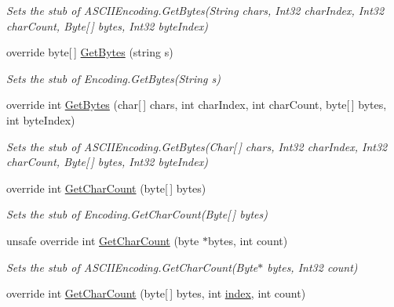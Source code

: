 \begin{DoxyCompactItemize}
\begin{DoxyCompactList}\small\item\em Sets the stub of A\-S\-C\-I\-I\-Encoding.\-Get\-Bytes(\-String chars, Int32 char\-Index, Int32 char\-Count, Byte\mbox{[}$\,$\mbox{]} bytes, Int32 byte\-Index)\end{DoxyCompactList}\item 
override byte\mbox{[}$\,$\mbox{]} \hyperlink{class_system_1_1_text_1_1_fakes_1_1_stub_a_s_c_i_i_encoding_a6a67939da871370d263557d9ad24a00f}{Get\-Bytes} (string s)
\begin{DoxyCompactList}\small\item\em Sets the stub of Encoding.\-Get\-Bytes(\-String s)\end{DoxyCompactList}\item 
override int \hyperlink{class_system_1_1_text_1_1_fakes_1_1_stub_a_s_c_i_i_encoding_ae08b1f8da049cfd0b1e1a570e6125f6d}{Get\-Bytes} (char\mbox{[}$\,$\mbox{]} chars, int char\-Index, int char\-Count, byte\mbox{[}$\,$\mbox{]} bytes, int byte\-Index)
\begin{DoxyCompactList}\small\item\em Sets the stub of A\-S\-C\-I\-I\-Encoding.\-Get\-Bytes(\-Char\mbox{[}$\,$\mbox{]} chars, Int32 char\-Index, Int32 char\-Count, Byte\mbox{[}$\,$\mbox{]} bytes, Int32 byte\-Index)\end{DoxyCompactList}\item 
override int \hyperlink{class_system_1_1_text_1_1_fakes_1_1_stub_a_s_c_i_i_encoding_a07a09c7dd29edd7cd0a8032d22006d9d}{Get\-Char\-Count} (byte\mbox{[}$\,$\mbox{]} bytes)
\begin{DoxyCompactList}\small\item\em Sets the stub of Encoding.\-Get\-Char\-Count(\-Byte\mbox{[}$\,$\mbox{]} bytes)\end{DoxyCompactList}\item 
unsafe override int \hyperlink{class_system_1_1_text_1_1_fakes_1_1_stub_a_s_c_i_i_encoding_afdc5567a1a794c53bcb40b486a847ae4}{Get\-Char\-Count} (byte $\ast$bytes, int count)
\begin{DoxyCompactList}\small\item\em Sets the stub of A\-S\-C\-I\-I\-Encoding.\-Get\-Char\-Count(\-Byte$\ast$ bytes, Int32 count)\end{DoxyCompactList}\item 
override int \hyperlink{class_system_1_1_text_1_1_fakes_1_1_stub_a_s_c_i_i_encoding_a67dc4d5dba9e065e97f6033a0687b51a}{Get\-Char\-Count} (byte\mbox{[}$\,$\mbox{]} bytes, int \hyperlink{jquery-1_810_82-vsdoc_8js_a75bb12d1f23302a9eea93a6d89d0193e}{index}, int count)

\end{DoxyCompactItemize}
